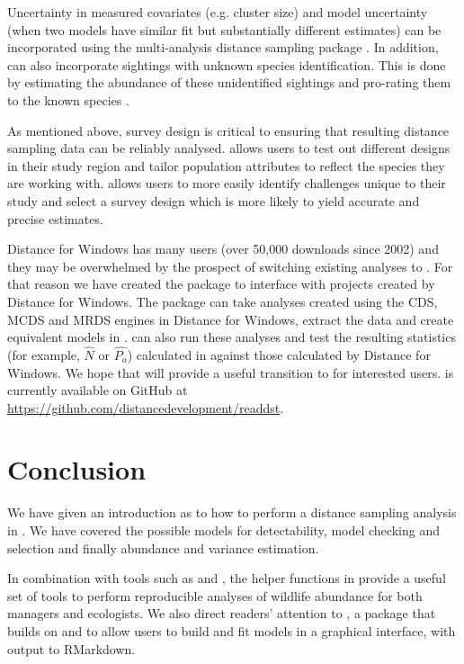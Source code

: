 \documentclass[article]{jss}\usepackage[]{graphicx}\usepackage[]{color}
\begin{document}
Uncertainty in measured covariates (e.g. cluster size) and model uncertainty (when two models have similar fit but substantially different estimates) can be incorporated using the multi-analysis distance sampling package  \citep{mads-pkg}. In addition,  can also incorporate sightings with unknown species identification. This is done by estimating the abundance of these unidentified sightings and pro-rating them to the known species \citep{Gerrodette:2005}.

As mentioned above, survey design is critical to ensuring that resulting distance sampling data can be reliably analysed.  allows users to test out different designs in their study region and tailor population attributes to reflect the species they are working with.  \citep{DSsim-pkg} allows users to more easily identify challenges unique to their study and select a survey design which is more likely to yield accurate and precise estimates.

Distance for Windows has many users (over 50,000 downloads since 2002) and they may be overwhelmed by the prospect of switching existing analyses to . For that reason we have created the  \citep{readdst-pkg} package to interface with projects created by Distance for Windows. The package can take analyses created using the CDS, MCDS and MRDS engines in Distance for Windows, extract the data and create equivalent models in .  can also run these analyses and test the resulting statistics (for example, $\hat{N}$ or $\hat{P_a}$) calculated in  against those calculated by Distance for Windows. We hope that  will provide a useful transition to  for interested users.  is currently available on GitHub at \url{https://github.com/distancedevelopment/readdst}.

\section{Conclusion}

We have given an introduction as to how to perform a distance sampling analysis in . We have covered the possible models for detectability, model checking and selection and finally abundance and variance estimation.

In combination with tools such as  and  \citep{rmarkdown-pkg}, the helper functions in  provide a useful set of tools to perform reproducible analyses of wildlife abundance for both managers and ecologists. We also direct readers' attention to  \citep{dsshiny-pkg}, a package that builds on  \citep{shiny-pkg} and  to allow users to build and fit models in a graphical interface, with output to RMarkdown.
\end{document}
